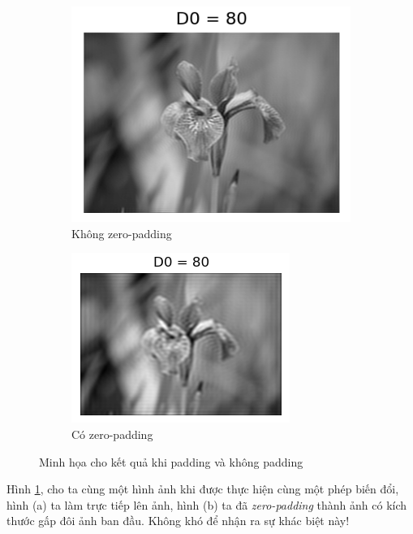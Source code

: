 \documentclass{article}
\begin{document}
        \begin{figure}[ht!]
            \centering
            \begin{subfigure}[b]{0.4\linewidth}
                \includegraphics[width=\linewidth]{fo8.png}
                \caption{Không zero-padding}
            \end{subfigure}
            \begin{subfigure}[b]{0.4\linewidth}
                \includegraphics[width=\linewidth]{fo7.png}
                \caption{Có zero-padding}
            \end{subfigure}
            \caption{Minh họa cho kết quả khi padding và không padding}
            \label{fig9}
        \end{figure}
            Hình \ref{fig9}, cho ta cùng một hình ảnh khi được thực hiện cùng một phép biến đổi, hình (a) ta làm trực tiếp lên ảnh, hình (b) ta đã \textit{zero-padding} thành ảnh có kích thước gấp đôi ảnh ban đầu. Không khó để nhận ra sự khác biệt này!
\end{document}
